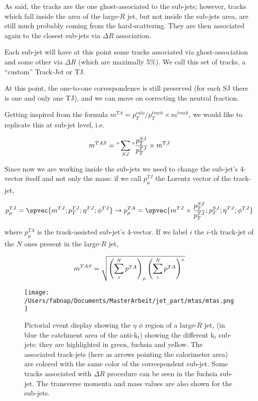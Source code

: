 As said, the tracks are the one ghost-associated to the sub-jets; however, tracks which fall inside the area of the large-$R$ jet, but not inside the sub-jets area, are still much probably coming from the hard-scattering. They are then associated again to the closest sub-jets via $\Delta R$ association.

Each sub-jet will have at this point some tracks associated via ghost-association and some other via $\Delta R$ (which are maximally 5\%). We call this set of tracks, a ``custom'' Track-Jet or TJ.

At this point, the one-to-one correspondence is still preserved (for each SJ there is one and only one TJ), and we can move on correcting the neutral fraction.

Getting inspired from the formula $m^{TA}=p_T^{calo}/p_T^{track}\times m^{track}$, we would like to replicate this at sub-jet level, i.e.

$$m^{TAS}="\sum_{SJ}"\frac{p_T^{SJ}}{p_T^{TJ}}\times m^{TJ}$$

Since now we are working inside the sub-jets we need to change the sub-jet's 4-vector itself and not only the mass: if we call $p_\mu^{TJ}$ the Lorentz vector of the track-jet, 

$$p_\mu^{TJ} = \spvec{m^{TJ};p_T^{TJ};\eta^{TJ};\phi^{TJ}} \to p_\mu^{TA}=\spvec{m^{TJ}\times\frac{p_T^{SJ}}{p_T^{TJ}} ;p_T^{SJ};\eta^{TJ};\phi^{TJ}} $$
 
where $p_\mu^{TA}$ is the track-assisted sub-jet's 4-vector. If we label $i$ the $i$-th track-jet of the $N$ ones present in the large-$R$ jet,

$$ m^{TAS}=\sqrt{\left(\sum_i^N p^{TA} \right)_\mu \left(\sum_i^N p^{TA} \right)^{_\mu}} $$
 
\begin{figure}[!ht]
  \centering
      \texttt{[image: /Users/fabnap/Documents/MasterArbeit/jet\_part/mtas/mtas.png]}
  \caption[Pictorial event display]{Pictorial event display showing the $\eta$ $\phi$ region of a large-$R$ jet, (in blue the catchment area of the anti-k$_t$) showing the different k$_t$ sub-jets: they are highlighted in green, fuchsia and yellow. The associated track-jets (here as arrows pointing the calorimeter area) are colored with the same color of the correspondent sub-jet. Some tracks associated with $\Delta R$ procedure can be seen in the fuchsia sub-jet. The transverse momenta and mass values are also shown for the sub-jets.}
  \label{fig:mtas1}
\end{figure}

